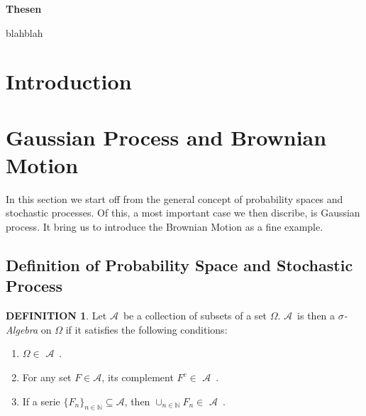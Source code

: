 \documentclass[a4paper, twoside, 11pt]{article}
\theoremstyle{definition}
\newtheorem{definition}{DEFINITION}[section]
\def\AA{$\mathscr{A}$\ }
\newcommand{\compl}[1]{{#1}^{c}}
\renewenvironment{abstract}{
  \begin{center}
  		\Large
		\textbf{Thesen}
		\hspace{2em}
  \end{center}				
}{}
\begin{document}

\newpage

\thispagestyle{empty}
\begin{abstract}
  blahblah
\end{abstract}
\newpage

\thispagestyle{empty}
\mbox{}
\newpage
\fancyhead[LO, RE]{}
\fancyfoot[LE, RO]{}
\tableofcontents
\newpage
\thispagestyle{empty}
\mbox{}
\newpage

\fancyhead[LO, RE]{\rightmark}
\fancyfoot[LE, RO]{\large \thepage}
\setcounter{section}{0}
\setcounter{page}{1}
\section{Introduction}

\newpage

\section{Gaussian Process and Brownian Motion }
In this section we start off from the general concept of probability spaces and stochastic processes. Of this, a most important case we then discribe, is Gaussian process. It bring us to introduce the Brownian Motion as a fine example.

\subsection{Definition of Probability Space and Stochastic Process }
\begin{definition}
  Let \AA be a collection of subsets of a set $\Omega$. \AA is then a \emph{$\sigma$- Algebra} on $\Omega$ if it satisfies the following conditions:
  \begin{enumerate}[topsep=0pt, itemsep=-1ex, partopsep=1ex, parsep=1ex, label=(\roman*)]
	\item $\Omega \in $ \AA.
	\item For any set $F \in \mathscr{A}$, its complement $\compl{F} \in$ \AA.
	\item If a serie $\{F_n\}_{n \in \mathbb{N}} \subseteq \mathscr{A}$, then $\cup_{n \in \mathbb{N}}F_n \in $ \AA.
  \end{enumerate}
\end{definition}
\end{document}
